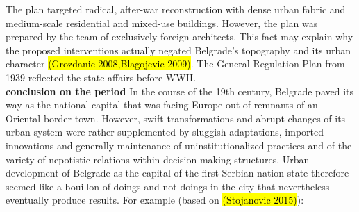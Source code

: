 \documentclass[11pt]{report}
\begin{document}
The plan targeted radical, after-war reconstruction with dense urban fabric and medium-scale residential and mixed-use buildings.
However, the plan was prepared by the team of exclusively foreign architects. This fact may explain why the proposed interventions actually negated Belgrade’s  topography  and  its  urban  character \hl{(Grozdanic 2008,Blagojevic 2009)}.
The General Regulation Plan from 1939 reflected the state  affairs before WWII.
\\
\textbf{conclusion on the period}
In the course of the 19th century, Belgrade paved its way as the national capital that was facing Europe out of remnants of an Oriental border-town.
However, swift transformations and abrupt changes of its urban system were rather supplemented by sluggish adaptations, imported innovations and generally maintenance of uninstitutionalized practices and of the variety of nepotistic relations within decision making structures.
Urban development of Belgrade as the capital of the first Serbian nation state therefore seemed like a bouillon of doings and not-doings in the city that nevertheless eventually produce results. For example (based on \hl{(Stojanovic 2015)}):
\end{document}
